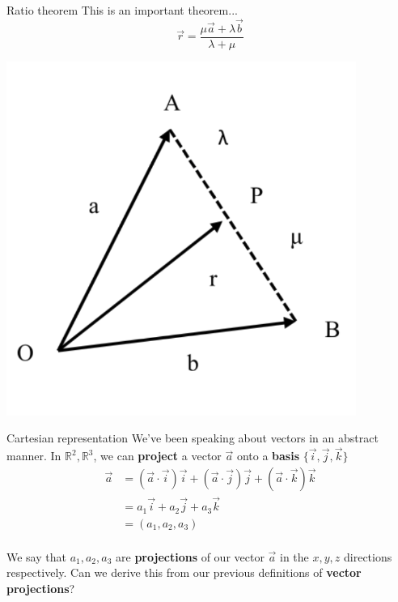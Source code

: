 \documentclass{beamer}
\begin{document}
\begin{frame}{Ratio theorem}
	This is an important theorem...
	$$\vec{r} = \dfrac{\mu\vec{a} + \lambda \vec{b}}{\lambda + \mu}$$
	\begin{center}
	\includegraphics[scale = 0.40]{img/ratio_theorem.png}
	\end{center}
\end{frame}

\begin{frame}{Cartesian representation}
	We've been speaking about vectors in an abstract manner. In $\mathbb{R}^2, \mathbb{R}^3$, we can \textbf{project} a vector $\vec{a}$ onto a \textbf{basis} $\{\vec{i}, \vec{j}, \vec{k}\}$
	\begin{align*}
		\vec{a} &= (\vec{a}\cdot\vec{i})\vec{i} + (\vec{a}\cdot\vec{j})\vec{j} + (\vec{a}\cdot\vec{k})\vec{k}\\
				&= a_1\vec{i} + a_2\vec{j} + a_3\vec{k}\\
				&= (a_1, a_2, a_3)\\
	\end{align*}
	
	We say that $a_1, a_2, a_3$ are \textbf{projections} of our vector $\vec{a}$ in the $x, y, z$ directions respectively. Can we derive this from our previous definitions of \textbf{vector projections}?
\end{frame}
\end{document}
